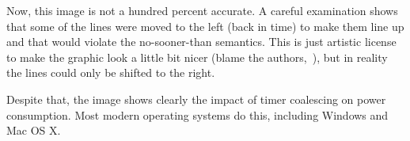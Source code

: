 Now, this image is not a hundred percent accurate. A careful examination shows that some of the lines were moved to the left (back in time) to make them line up and that would violate the no-sooner-than semantics. This is just artistic license to make the graphic look a little bit nicer (blame the authors,~\cite{coalesce}), but in reality the lines could only be shifted to the right.

Despite that, the image shows clearly the impact of timer coalescing on power consumption. Most modern operating systems do this, including Windows and Mac OS X.





